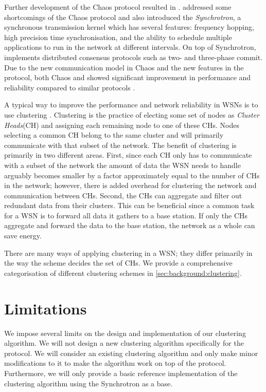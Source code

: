 Further development of the Chaos protocol resulted in \atwo{} \cite{a2-introduction-paper}. \atwo{} addressed some shortcomings of the Chaos protocol and also introduced the \atwo{} \textit{Synchrotron}, a synchronous transmission kernel which has several features: frequency hopping, high precision time synchronisation, and the ability to schedule multiple applications to run in the network at different intervals. On top of Synchrotron, \atwo{} implements distributed consensus protocols such as two- and three-phase commit. Due to the new communication model in Chaos and the new features in the \atwo{} protocol, both Chaos and \atwo{} showed significant improvement in performance and reliability compared to similar protocols \cite{chaos-introduction-paper, a2-introduction-paper}.

A typical way to improve the performance and network reliability in WSNs is to use clustering \cite{Afsar2014-clustering-survey, Younis2006-clustering-survey}. Clustering is the practice of electing some set of nodes as \emph{Cluster Heads}(CH) and assigning each remaining node to one of these CHs. Nodes selecting a common CH belong to the same cluster and will primarily communicate with that subset of the network. The benefit of clustering is primarily in two different areas. First, since each CH only has to communicate with a subset of the network the amount of data the WSN needs to handle arguably becomes smaller by a factor approximately equal to the number of CHs in the network; however, there is added overhead for clustering the network and communication between CHs. Second, the CHs can aggregate and filter out redundant data from their clusters. This can be beneficial since a common task for a WSN is to forward all data it gathers to a base station. If only the CHs aggregate and forward the data to the base station, the network as a whole can save energy. 

There are many ways of applying clustering in a WSN; they differ primarily in the way the scheme decides the set of CHs. We provide a comprehensive categorisation of different clustering schemes in \cref{sec:background:clustering}.


\section{Limitations}
We impose several limits on the design and implementation of our clustering algorithm. We will not design a new clustering algorithm specifically for the \atwo{} protocol. We will consider an existing clustering algorithm and only make minor modifications to it to make the algorithm work on top of the \atwo{} protocol. Furthermore, we will only provide a basic reference implementation of the clustering algorithm using the \atwo{} Synchrotron as a base.

